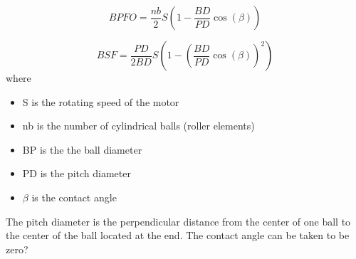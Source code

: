 \documentclass[../Main/thesis.tex]{subfiles}
\begin{document}
\begin{equation}\label{eq:bpfo}
BPFO = \frac{nb}{2}S\left( 1 -  \frac{BD}{PD}\cos(\beta)  \right)
\end{equation}

\begin{equation}\label{eq:bpfi}
BSF = \frac{PD}{2BD}S\left( 1 -  \left(\frac{BD}{PD}\cos(\beta)\right)^{2}  \right)
\end{equation}
\clearpage
where 
\begin{itemize}
\item S is the rotating speed of the motor
\item nb is the number of cylindrical balls (roller elements)
\item BP is the the ball diameter
\item PD is the pitch diameter
\item $\beta$ is the contact angle
\end{itemize}
The pitch diameter is the perpendicular distance from the center of one ball to the center of the ball located at the end. The contact angle can be taken to be zero?
\end{document}
